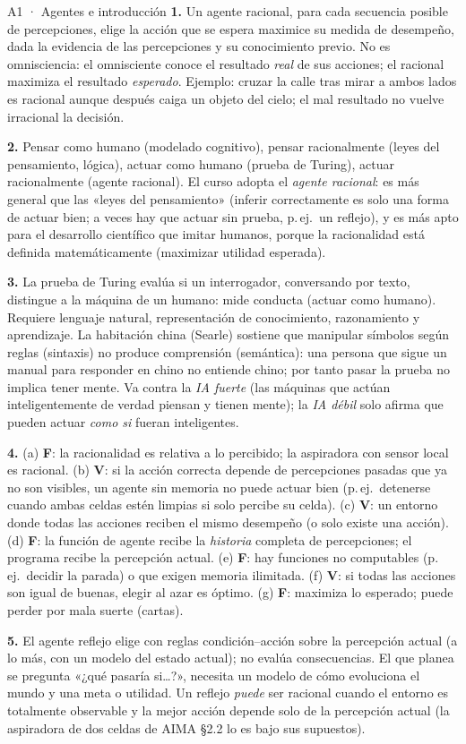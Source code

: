 \begin{solucion}{A1 · Agentes e introducción}
\textbf{1.} Un agente racional, para cada secuencia posible de percepciones, elige la acción que se
espera maximice su medida de desempeño, dada la evidencia de las percepciones y su conocimiento
previo. No es omnisciencia: el omnisciente conoce el resultado \emph{real} de sus acciones; el
racional maximiza el resultado \emph{esperado}. Ejemplo: cruzar la calle tras mirar a ambos lados
es racional aunque después caiga un objeto del cielo; el mal resultado no vuelve irracional la decisión.

\textbf{2.} Pensar como humano (modelado cognitivo), pensar racionalmente (leyes del pensamiento,
lógica), actuar como humano (prueba de Turing), actuar racionalmente (agente racional). El curso
adopta el \emph{agente racional}: es más general que las «leyes del pensamiento» (inferir
correctamente es solo una forma de actuar bien; a veces hay que actuar sin prueba, p.\,ej.\ un
reflejo), y es más apto para el desarrollo científico que imitar humanos, porque la racionalidad
está definida matemáticamente (maximizar utilidad esperada).

\textbf{3.} La prueba de Turing evalúa si un interrogador, conversando por texto, distingue a la
máquina de un humano: mide conducta (actuar como humano). Requiere lenguaje natural, representación
de conocimiento, razonamiento y aprendizaje. La habitación china (Searle) sostiene que manipular
símbolos según reglas (sintaxis) no produce comprensión (semántica): una persona que sigue un
manual para responder en chino no entiende chino; por tanto pasar la prueba no implica tener
mente. Va contra la \emph{IA fuerte} (las máquinas que actúan inteligentemente de verdad piensan y
tienen mente); la \emph{IA débil} solo afirma que pueden actuar \emph{como si} fueran inteligentes.

\textbf{4.} (a) \textbf{F}: la racionalidad es relativa a lo percibido; la aspiradora con sensor
local es racional. (b) \textbf{V}: si la acción correcta depende de percepciones pasadas que ya no
son visibles, un agente sin memoria no puede actuar bien (p.\,ej.\ detenerse cuando ambas celdas
estén limpias si solo percibe su celda). (c) \textbf{V}: un entorno donde todas las acciones
reciben el mismo desempeño (o solo existe una acción). (d) \textbf{F}: la función de agente
recibe la \emph{historia} completa de percepciones; el programa recibe la percepción actual.
(e) \textbf{F}: hay funciones no computables (p.\,ej.\ decidir la parada) o que exigen memoria
ilimitada. (f) \textbf{V}: si todas las acciones son igual de buenas, elegir al azar es óptimo.
(g) \textbf{F}: maximiza lo esperado; puede perder por mala suerte (cartas).

\textbf{5.} El agente reflejo elige con reglas condición–acción sobre la percepción actual (a lo
más, con un modelo del estado actual); no evalúa consecuencias. El que planea se pregunta «¿qué
pasaría si…?», necesita un modelo de cómo evoluciona el mundo y una meta o utilidad. Un reflejo
\emph{puede} ser racional cuando el entorno es totalmente observable y la mejor acción depende solo
de la percepción actual (la aspiradora de dos celdas de AIMA §2.2 lo es bajo sus supuestos).
\end{solucion}

